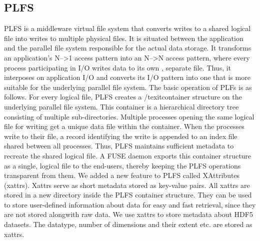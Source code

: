 \subsection{PLFS}
PLFS is a middleware virtual file system that converts writes to a shared logical file into writes to multiple physical files. 
It is situated between the application and the parallel file system responsible for the actual data storage. 
It transforms an application's N-->1 access pattern into an N-->N access pattern, where every process participating in I/O writes data to its own , separate file. 
Thus, it interposes on application I/O and converts its I/O pattern into one that is more suitable for the underlying parallel file system.
The basic operation of PLFs is as follows. For every logical file, PLFS creates a /texit{container} structure on the underlying parallel file system. 
This container is a hierarchical directory tree consisting of multiple sub-directories. Multiple processes opening the same logical file for writing get a unique data file within the container. When the processes write to their file, a record identifying the write is appended to an index file shared between all processes. Thus, PLFS maintains sufficient metadata to recreate the shared logical file. A FUSE daemon exports this container structure as a single, logical file to the end-users, thereby keeping the PLFS operations transparent from them. 
We added a new feature to PLFS called XAttributes (xattrs). Xattrs serve as short metadata stored as key-value pairs.
All xattrs are stored in a new directory inside the PLFS container structure. They can be used to store user-defined information about data for easy and fast retrieval, since they are not stored alongwith raw data. 
We use xattrs to store metadata about HDF5 datasets. The datatype, number of dimensions and their extent etc. are stored as xattrs. 